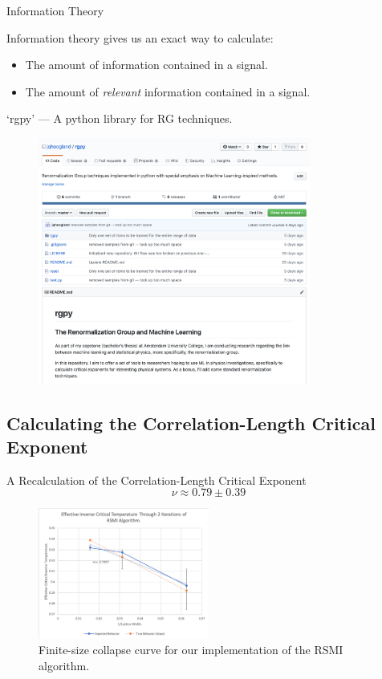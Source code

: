 \documentclass{beamer}
\begin{document}
\begin{frame}{Information Theory}

  {\Large Information theory gives us an exact way to calculate:}
  \begin{itemize}
  \item The amount of information contained in a signal.
  \item The amount of \textit{relevant} information contained in a
    signal.
  \end{itemize}

\end{frame}

\begin{frame}{`rgpy' --- A python library for RG techniques.}
  \begin{figure}[ht]
    \centering \includegraphics[width=0.8\textwidth]{figures/rgpy.png}
  \end{figure}

\end{frame}

\subsection{Calculating the Correlation-Length Critical Exponent}
\begin{frame}{A Recalculation of the Correlation-Length Critical Exponent}
  \begin{equation*}%
    \boxed{\nu\approx 0.79 \pm0.39}
  \end{equation*}%

  \begin{figure}
    \centering
    \includegraphics[width=0.5\textwidth]{figures/crit-exponent.png}
    \caption{Finite-size collapse curve for our implementation of the RSMI algorithm.}
  \end{figure}

\end{frame}
\end{document}
